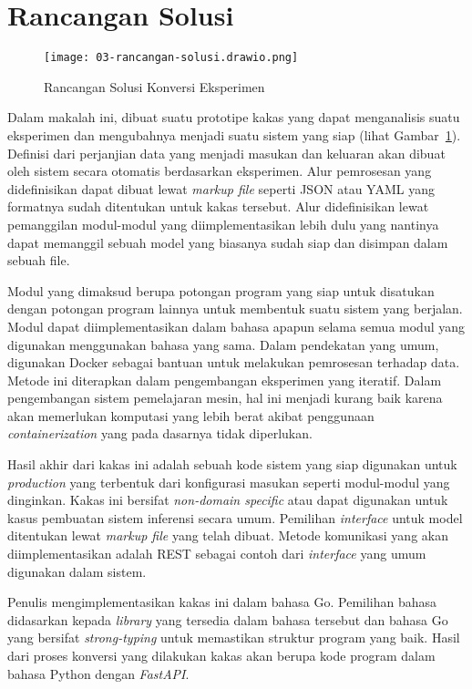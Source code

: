 \section{Rancangan Solusi}

\begin{figure}[ht]
  \centering
  \texttt{[image: 03-rancangan-solusi.drawio.png]}
  \caption{Rancangan Solusi Konversi Eksperimen}\label{fig:03-tool}
\end{figure}

Dalam makalah ini, dibuat suatu prototipe kakas yang dapat menganalisis suatu eksperimen dan mengubahnya menjadi suatu sistem yang siap (lihat Gambar~\ref{fig:03-tool}).
Definisi dari perjanjian data yang menjadi masukan dan keluaran akan dibuat oleh sistem secara otomatis berdasarkan eksperimen.
Alur pemrosesan yang didefinisikan dapat dibuat lewat \textit{markup file} seperti JSON atau YAML yang formatnya sudah ditentukan untuk kakas tersebut.
Alur didefinisikan lewat pemanggilan modul-modul yang diimplementasikan lebih dulu yang nantinya dapat memanggil sebuah model yang biasanya sudah siap dan disimpan dalam sebuah file.

Modul yang dimaksud berupa potongan program yang siap untuk disatukan dengan potongan program lainnya untuk membentuk suatu sistem yang berjalan.
Modul dapat diimplementasikan dalam bahasa apapun selama semua modul yang digunakan menggunakan bahasa yang sama.
Dalam pendekatan yang umum, digunakan Docker sebagai bantuan untuk melakukan pemrosesan terhadap data.
Metode ini diterapkan dalam pengembangan eksperimen yang iteratif.
Dalam pengembangan sistem pemelajaran mesin, hal ini menjadi kurang baik karena akan memerlukan komputasi yang lebih berat akibat penggunaan \textit{containerization} yang pada dasarnya tidak diperlukan.

Hasil akhir dari kakas ini adalah sebuah kode sistem yang siap digunakan untuk \textit{production} yang terbentuk dari konfigurasi masukan seperti modul-modul yang dinginkan.
Kakas ini bersifat \textit{non-domain specific} atau dapat digunakan untuk kasus pembuatan sistem inferensi secara umum.
Pemilihan \textit{interface} untuk model ditentukan lewat \textit{markup file} yang telah dibuat.
Metode komunikasi yang akan diimplementasikan adalah REST sebagai contoh dari \textit{interface} yang umum digunakan dalam sistem.

Penulis mengimplementasikan kakas ini dalam bahasa Go.
Pemilihan bahasa didasarkan kepada \textit{library} yang tersedia dalam bahasa tersebut dan bahasa Go yang bersifat \textit{strong-typing} untuk memastikan struktur program yang baik.
Hasil dari proses konversi yang dilakukan kakas akan berupa kode program dalam bahasa Python dengan \textit{FastAPI}.

